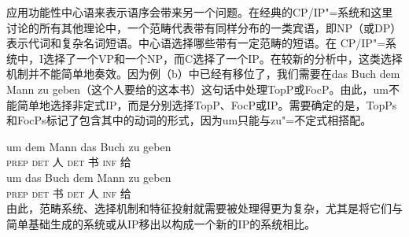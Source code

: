 应用功能性中心语来表示语序会带来另一个问题。在经典的CP/IP"=系统和这里讨论的所有其他理论中，一个范畴代表带有同样分布的一类宾语，即NP（或DP）表示代词和复杂名词短语。中心语选择哪些带有一定范畴的短语。在
CP/IP"=系统中，I选择了一个VP和一个NP，而C选择了一个IP。在较新的分析中，这类选择机制并不能简单地奏效。因为例（b）中已经有移位了，我们需要在das Buch dem Mann zu
geben（这个人要给的这本书）这句话中处理TopP或FocP。由此，um不能简单地选择非定式IP，而是分别选择TopP、FocP或IP。需要确定的是，TopPs和FocPs标记了包含其中的动词的形式，因为um只能与zu"=不定式相搭配。

\eal
\ex 
\gll um dem Mann das Buch zu geben\\
     \textsc{prep} \textsc{det} 人 \textsc{det} 书 \textsc{inf} 给\\
\ex 
\gll um das Buch dem Mann zu geben\\
     \textsc{prep} \textsc{det} 书 \textsc{det} 人 \textsc{inf} 给\\
\zl
由此，范畴系统、选择机制和特征投射就需要被处理得更为复杂，尤其是将它们与简单基础生成的系统或从IP移出以构成一个新的IP的系统相比。

